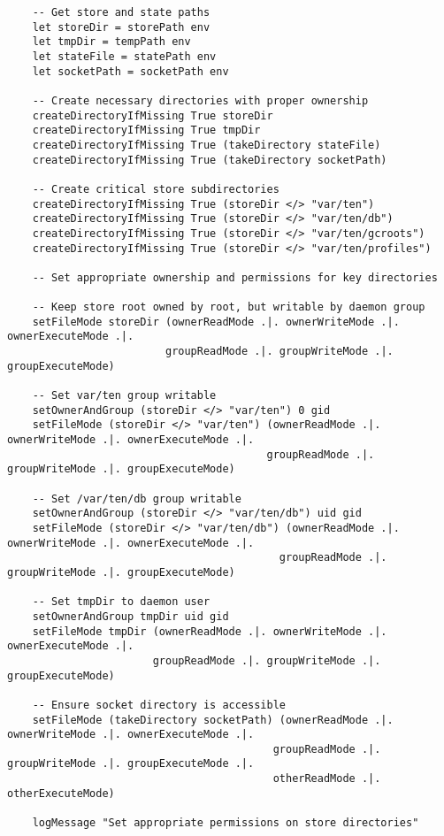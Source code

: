 \documentclass{article}
\begin{document}
\begin{tcolorbox}[title=Ten/Daemon/Core.hs Changes]
\begin{verbatim}
    -- Get store and state paths
    let storeDir = storePath env
    let tmpDir = tempPath env
    let stateFile = statePath env
    let socketPath = socketPath env

    -- Create necessary directories with proper ownership
    createDirectoryIfMissing True storeDir
    createDirectoryIfMissing True tmpDir
    createDirectoryIfMissing True (takeDirectory stateFile)
    createDirectoryIfMissing True (takeDirectory socketPath)

    -- Create critical store subdirectories
    createDirectoryIfMissing True (storeDir </> "var/ten")
    createDirectoryIfMissing True (storeDir </> "var/ten/db")
    createDirectoryIfMissing True (storeDir </> "var/ten/gcroots")
    createDirectoryIfMissing True (storeDir </> "var/ten/profiles")

    -- Set appropriate ownership and permissions for key directories

    -- Keep store root owned by root, but writable by daemon group
    setFileMode storeDir (ownerReadMode .|. ownerWriteMode .|. ownerExecuteMode .|.
                         groupReadMode .|. groupWriteMode .|. groupExecuteMode)

    -- Set var/ten group writable
    setOwnerAndGroup (storeDir </> "var/ten") 0 gid
    setFileMode (storeDir </> "var/ten") (ownerReadMode .|. ownerWriteMode .|. ownerExecuteMode .|.
                                         groupReadMode .|. groupWriteMode .|. groupExecuteMode)

    -- Set /var/ten/db group writable
    setOwnerAndGroup (storeDir </> "var/ten/db") uid gid
    setFileMode (storeDir </> "var/ten/db") (ownerReadMode .|. ownerWriteMode .|. ownerExecuteMode .|.
                                           groupReadMode .|. groupWriteMode .|. groupExecuteMode)

    -- Set tmpDir to daemon user
    setOwnerAndGroup tmpDir uid gid
    setFileMode tmpDir (ownerReadMode .|. ownerWriteMode .|. ownerExecuteMode .|.
                       groupReadMode .|. groupWriteMode .|. groupExecuteMode)

    -- Ensure socket directory is accessible
    setFileMode (takeDirectory socketPath) (ownerReadMode .|. ownerWriteMode .|. ownerExecuteMode .|.
                                          groupReadMode .|. groupWriteMode .|. groupExecuteMode .|.
                                          otherReadMode .|. otherExecuteMode)

    logMessage "Set appropriate permissions on store directories"


\end{verbatim}
\end{tcolorbox}
\end{document}
